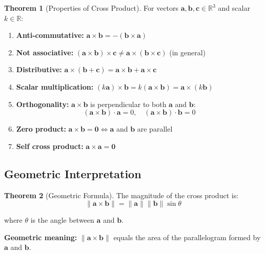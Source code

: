 \documentclass[12pt,a4paper]{article}
\theoremstyle{definition}
\newtheorem{theorem}{Theorem}[section]
\begin{document}
\begin{theorem}[Properties of Cross Product]
For vectors $\mathbf{a}, \mathbf{b}, \mathbf{c} \in \mathbb{R}^3$ and scalar $k \in \mathbb{R}$:

\begin{enumerate}
    \item \textbf{Anti-commutative:} $\mathbf{a} \times \mathbf{b} = -(\mathbf{b} \times \mathbf{a})$
    
    \item \textbf{Not associative:} $(\mathbf{a} \times \mathbf{b}) \times \mathbf{c} \neq \mathbf{a} \times (\mathbf{b} \times \mathbf{c})$ (in general)
    
    \item \textbf{Distributive:} $\mathbf{a} \times (\mathbf{b} + \mathbf{c}) = \mathbf{a} \times \mathbf{b} + \mathbf{a} \times \mathbf{c}$
    
    \item \textbf{Scalar multiplication:} $(k\mathbf{a}) \times \mathbf{b} = k(\mathbf{a} \times \mathbf{b}) = \mathbf{a} \times (k\mathbf{b})$
    
    \item \textbf{Orthogonality:} $\mathbf{a} \times \mathbf{b}$ is perpendicular to both $\mathbf{a}$ and $\mathbf{b}$:
    \begin{equation}
    (\mathbf{a} \times \mathbf{b}) \cdot \mathbf{a} = 0, \quad (\mathbf{a} \times \mathbf{b}) \cdot \mathbf{b} = 0
    \end{equation}
    
    \item \textbf{Zero product:} $\mathbf{a} \times \mathbf{b} = \mathbf{0} \iff \mathbf{a}$ and $\mathbf{b}$ are parallel
    
    \item \textbf{Self cross product:} $\mathbf{a} \times \mathbf{a} = \mathbf{0}$
\end{enumerate}
\end{theorem}

\subsection{Geometric Interpretation}

\begin{theorem}[Geometric Formula]
The magnitude of the cross product is:
\begin{equation}
\|\mathbf{a} \times \mathbf{b}\| = \|\mathbf{a}\| \|\mathbf{b}\| \sin \theta
\end{equation}

where $\theta$ is the angle between $\mathbf{a}$ and $\mathbf{b}$.

\textbf{Geometric meaning:} $\|\mathbf{a} \times \mathbf{b}\|$ equals the area of the parallelogram formed by $\mathbf{a}$ and $\mathbf{b}$.
\end{theorem}
\end{document}
